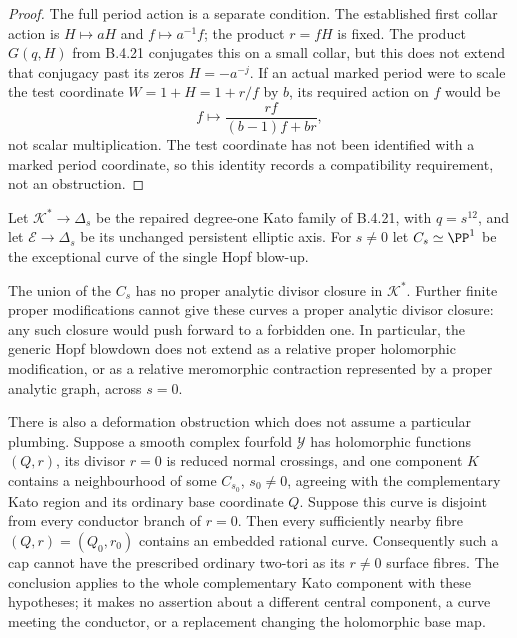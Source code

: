 \begin{proof}
The full period action is a separate condition. The established
first collar action is $H\mapsto aH$ and $f\mapsto a^{-1}f$;
the product $r=fH$ is fixed. The product $G(q,H)$ from B.4.21
conjugates this on a small collar, but this does not extend that
conjugacy past its zeros $H=-a^{-j}$. If an actual marked period
were to scale the test coordinate $W=1+H=1+r/f$ by $b$, its
required action on $f$ would be
\[
 f\longmapsto\frac{rf}{(b-1)f+br},
\]
not scalar multiplication. The test coordinate has not been
identified with a marked period coordinate, so this identity
records a compatibility requirement, not an obstruction.
\end{proof}

\begin{proposition}\label{push:src:B.4.23}
Let $\mathcal K^*\to\Delta_s$ be the repaired degree-one
Kato family of B.4.21, with $q=s^{12}$, and let
$\mathcal E\to\Delta_s$ be its unchanged persistent elliptic
axis. For $s\ne0$ let $C_s\simeq\PP^1$ be the exceptional
curve of the single Hopf blow-up.

The union of the $C_s$ has no proper analytic divisor
closure in $\mathcal K^*$. Further finite proper modifications
cannot give these curves a proper analytic divisor closure:
any such closure would push forward to a forbidden one.
In particular, the generic Hopf blowdown does not extend
as a relative proper holomorphic modification, or as a
relative meromorphic contraction represented by a proper
analytic graph, across $s=0$.

There is also a deformation obstruction which does not
assume a particular plumbing. Suppose a smooth complex
fourfold $\mathcal Y$ has holomorphic functions $(Q,r)$,
its divisor $r=0$ is reduced normal crossings, and one
component $K$ contains a neighbourhood of some $C_{s_0}$,
$s_0\ne0$, agreeing with the complementary Kato region
and its ordinary base coordinate $Q$. Suppose this curve
is disjoint from every conductor branch of $r=0$.
Then every sufficiently nearby fibre $(Q,r)=(Q_0,r_0)$
contains an embedded rational curve. Consequently such a
cap cannot have the prescribed ordinary two-tori as its
$r\ne0$ surface fibres. The conclusion applies to the
whole complementary Kato component with these hypotheses;
it makes no assertion about a different central component,
a curve meeting the conductor, or a replacement changing
the holomorphic base map.
\end{proposition}
